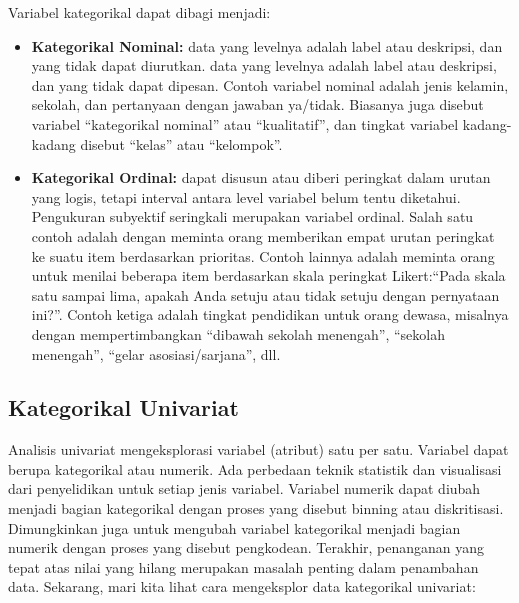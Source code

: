 \documentclass[
]{book}
\begin{document}
Variabel kategorikal dapat dibagi menjadi:

\begin{itemize}
\item
  \textbf{Kategorikal Nominal:} data yang levelnya adalah label atau deskripsi, dan yang tidak dapat diurutkan.
  data yang levelnya adalah label atau deskripsi, dan yang tidak dapat dipesan. Contoh variabel nominal adalah jenis kelamin, sekolah, dan pertanyaan dengan jawaban ya/tidak. Biasanya juga disebut variabel ``kategorikal nominal'' atau ``kualitatif'', dan tingkat variabel kadang-kadang disebut ``kelas'' atau ``kelompok''.
\item
  \textbf{Kategorikal Ordinal:} dapat disusun atau diberi peringkat dalam urutan yang logis, tetapi interval antara level variabel belum tentu diketahui. Pengukuran subyektif seringkali merupakan variabel ordinal. Salah satu contoh adalah dengan meminta orang memberikan empat urutan peringkat ke suatu item berdasarkan prioritas. Contoh lainnya adalah meminta orang untuk menilai beberapa item berdasarkan skala peringkat Likert:``Pada skala satu sampai lima, apakah Anda setuju atau tidak setuju dengan pernyataan ini?''. Contoh ketiga adalah tingkat pendidikan untuk orang dewasa, misalnya dengan mempertimbangkan ``dibawah sekolah menengah'', ``sekolah menengah'', ``gelar asosiasi/sarjana'', dll.
\end{itemize}

\hypertarget{kategorikal-univariat}{%
\subsection{Kategorikal Univariat}\label{kategorikal-univariat}}

Analisis univariat mengeksplorasi variabel (atribut) satu per satu. Variabel dapat berupa kategorikal atau numerik. Ada perbedaan teknik statistik dan visualisasi dari penyelidikan untuk setiap jenis variabel. Variabel numerik dapat diubah menjadi bagian kategorikal dengan proses yang disebut binning atau diskritisasi. Dimungkinkan juga untuk mengubah variabel kategorikal menjadi bagian numerik dengan proses yang disebut pengkodean. Terakhir, penanganan yang tepat atas nilai yang hilang merupakan masalah penting dalam penambahan data. Sekarang, mari kita lihat cara mengeksplor data kategorikal univariat:
\end{document}
